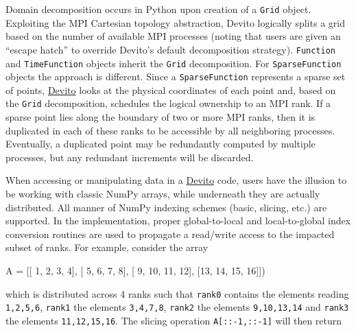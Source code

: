 \documentclass[10pt, conference]{IEEEtran}
\newenvironment{Shaded}{}{}
\newcommand{\DecValTok}[1]{\textcolor[rgb]{0.25,0.63,0.44}{{#1}}}
\newcommand{\NormalTok}[1]{{#1}}
\newcommand{\devito}{\href{https://github.com/devitocodes/devito}{Devito} }
\begin{document}
Domain decomposition occurs in Python upon creation of a \texttt{Grid}
object. Exploiting the MPI Cartesian topology abstraction, Devito
logically splits a grid based on the number of available MPI processes
(noting that users are given an ``escape hatch'' to override Devito's default
decomposition strategy).  \texttt{Function} and \texttt{TimeFunction}
objects inherit the \texttt{Grid} decomposition. For
\texttt{SparseFunction} objects the approach is different. Since a
\texttt{SparseFunction} represents a sparse set of points, \devito looks at
the physical coordinates of each point and, based on the \texttt{Grid}
decomposition, schedules the logical ownership to an MPI rank. If a sparse
point lies along the boundary of two or more MPI ranks, then it is
duplicated in each of these ranks to be accessible by all neighboring
processes. Eventually, a duplicated point may be redundantly computed by
multiple processes, but any redundant increments will be discarded.

When accessing or manipulating data in a \devito code, users have the
illusion to be working with classic NumPy arrays, while underneath they
are actually distributed. All manner of NumPy indexing schemes (basic,
slicing, etc.) are supported. In the implementation, proper
global-to-local and local-to-global index conversion routines are used to
propagate a read/write access to the impacted subset of ranks. For
example, consider the array

\begin{Shaded}
\begin{Highlighting}[]
\NormalTok{A = [[ }\DecValTok{1}\NormalTok{,  }\DecValTok{2}\NormalTok{,  }\DecValTok{3}\NormalTok{,  }\DecValTok{4}\NormalTok{],}
     \NormalTok{[ }\DecValTok{5}\NormalTok{,  }\DecValTok{6}\NormalTok{,  }\DecValTok{7}\NormalTok{,  }\DecValTok{8}\NormalTok{],}
     \NormalTok{[ }\DecValTok{9}\NormalTok{, }\DecValTok{10}\NormalTok{, }\DecValTok{11}\NormalTok{, }\DecValTok{12}\NormalTok{],}
     \NormalTok{[}\DecValTok{13}\NormalTok{, }\DecValTok{14}\NormalTok{, }\DecValTok{15}\NormalTok{, }\DecValTok{16}\NormalTok{]])}
\end{Highlighting}
\end{Shaded}
\noindent
which is distributed across 4 ranks such that \texttt{rank\phantom{\ }0}
contains the elements reading
\texttt{1,\phantom{\ }2,\phantom{\ }5,\phantom{\ }6},
\texttt{rank\phantom{\ }1} the elements
\texttt{3,\phantom{\ }4,\phantom{\ }7,\phantom{\ }8},
\texttt{rank\phantom{\ }2} the elements
\texttt{9,\phantom{\ }10,\phantom{\ }13,\phantom{\ }14} and
\texttt{rank\phantom{\ }3} the elements
\texttt{11,\phantom{\ }12,\phantom{\ }15,\phantom{\ }16}. The slicing
operation \texttt{A{[}::-1,\phantom{\ }::-1{]}} will then return
\end{document}
